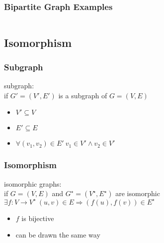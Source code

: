 \documentclass[dvipsnames]{beamer}
\begin{document}
\begin{frame}
  \frametitle{Bipartite Graph Examples}

  \begin{columns}[t]
    \begin{example}[$K_{2,3}$]
      \begin{center}
      \end{center}
    \end{example}

    \begin{example}[$K_{3,3}$]
      \begin{center}
      \end{center}
    \end{example}
  \end{columns}
\end{frame}

\subsection{Isomorphism}

\begin{frame}
  \frametitle{Subgraph}

  \begin{definition}
    \alert{subgraph}:\\
      if $G'=(V',E')$ is a subgraph of $G=(V,E)$

    \begin{itemize}
      \item $V' \subseteq V$
      \item $E' \subseteq E$
      \item $\forall (v_1,v_2) \in E'~v_1 \in V' \wedge v_2 \in V'$
    \end{itemize}
  \end{definition}
\end{frame}


\begin{frame}
  \frametitle{Isomorphism}

  \begin{definition}
    \alert{isomorphic graphs}:\\
    if $G=(V,E)$ and $G^\star=(V^\star,E^\star)$ are isomorphic\\
    $\exists f: V \rightarrow V^\star~(u,v) \in E \Rightarrow (f(u),f(v)) \in E^\star$

    \begin{itemize}
      \item $f$ is bijective
    \end{itemize}
  \end{definition}

  \pause
  \begin{itemize}
    \item can be drawn the same way
  \end{itemize}
\end{frame}
\end{document}

